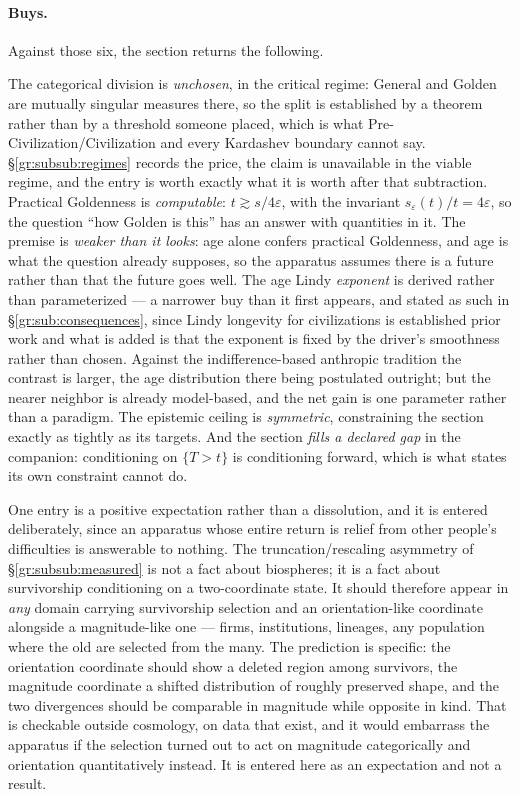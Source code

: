 \documentclass[11pt]{article}
\numberwithin{equation}{section}
\theoremstyle{plain}
\theoremstyle{definition}
\theoremstyle{remark}
\begin{document}
\paragraph{Buys.} Against those six, the section returns the following.

The categorical division is \emph{unchosen}, in the critical regime:
General and Golden are mutually singular measures there, so the split is
established by a theorem rather than by a threshold someone placed,
which is what Pre-Civilization/Civilization and every Kardashev boundary
cannot say. \S\ref{gr:subsub:regimes} records the price, the claim is
unavailable in the viable regime, and the entry is worth exactly what
it is worth after that subtraction.
Practical Goldenness is \emph{computable}: $t \gtrsim s/4\varepsilon$,
with the invariant $s_\varepsilon(t)/t = 4\varepsilon$, so the question
``how Golden is this'' has an answer with quantities in it. The premise
is \emph{weaker than it looks}: age alone confers practical Goldenness,
and age is what the question already supposes, so the apparatus assumes
there is a future rather than that the future goes well. The age
Lindy \emph{exponent} is derived rather than parameterized --- a
narrower buy than it first appears, and stated as such in
\S\ref{gr:sub:consequences}, since Lindy longevity for civilizations is
established prior work \cite{BC21,BG24,Kip20,Ord23} and what is added is
that the exponent is fixed by the driver's smoothness rather than
chosen. Against the indifference-based anthropic tradition
\cite{Car83,Got93,Bos02} the contrast is larger, the age distribution
there being postulated outright; but the nearer neighbor is already
model-based, and the net gain is one parameter rather than a
paradigm.
The epistemic ceiling is \emph{symmetric}, constraining the section
exactly as tightly as its targets. And the section \emph{fills a
declared gap} in the companion: conditioning on $\{T>t\}$ is
conditioning forward, which is what \cite{Ben26Optimal} states its own
constraint cannot do.

One entry is a positive expectation rather than a dissolution, and it is
entered deliberately, since an apparatus whose entire return is relief
from other people's difficulties is answerable to nothing. The
truncation/rescaling asymmetry of \S\ref{gr:subsub:measured} is not a
fact about biospheres; it is a fact about survivorship conditioning on a
two-coordinate state. It should therefore appear in \emph{any} domain
carrying survivorship selection and an orientation-like coordinate
alongside a magnitude-like one --- firms, institutions, lineages, any
population where the old are selected from the many. The prediction is
specific: the orientation coordinate should show a deleted region among
survivors, the magnitude coordinate a shifted distribution of roughly
preserved shape, and the two divergences should be comparable in
magnitude while opposite in kind. That is checkable outside cosmology,
on data that exist, and it would embarrass the apparatus if the
selection turned out to act on magnitude categorically and orientation
quantitatively instead. It is entered here as an expectation and not a
result.
\end{document}
